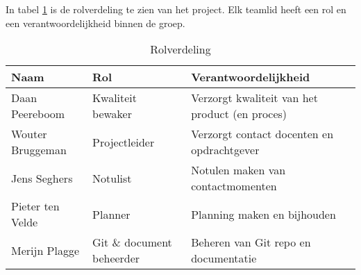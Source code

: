 In tabel \ref{tab:rolverdeling} is de rolverdeling te zien van het project. Elk teamlid heeft een rol en een verantwoordelijkheid binnen de groep.

\begin{table}[H]
    \centering
    \begin{tabular}{l l l}
         \bf Naam   & \bf Rol   & \bf Verantwoordelijkheid \\\hline
         Daan Peereboom & Kwaliteit bewaker &
                Verzorgt kwaliteit van het product (en proces)\\
         Wouter Bruggeman & Projectleider &
                Verzorgt contact docenten en opdrachtgever \\
         Jens Seghers  & Notulist & Notulen maken van contactmomenten \\
         Pieter ten Velde & Planner & Planning maken en bijhouden\\
         Merijn Plagge & Git \& document beheerder &
                Beheren van Git repo en documentatie\\
    \end{tabular}
    \caption{Rolverdeling}
    \label{tab:rolverdeling}
\end{table}